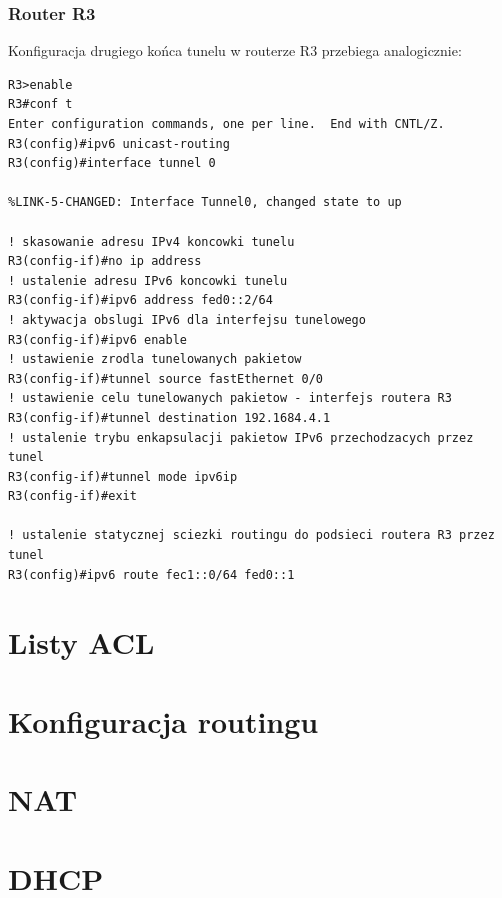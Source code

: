 \documentclass[polish,11pt,a4paper,twoside]{article}
\begin{document}
\subsubsection{Router R3}
Konfiguracja drugiego końca tunelu w routerze R3 przebiega analogicznie:
\begin{lstlisting}
R3>enable
R3#conf t
Enter configuration commands, one per line.  End with CNTL/Z.
R3(config)#ipv6 unicast-routing 
R3(config)#interface tunnel 0

%LINK-5-CHANGED: Interface Tunnel0, changed state to up

! skasowanie adresu IPv4 koncowki tunelu
R3(config-if)#no ip address 
! ustalenie adresu IPv6 koncowki tunelu
R3(config-if)#ipv6 address fed0::2/64
! aktywacja obslugi IPv6 dla interfejsu tunelowego
R3(config-if)#ipv6 enable
! ustawienie zrodla tunelowanych pakietow
R3(config-if)#tunnel source fastEthernet 0/0
! ustawienie celu tunelowanych pakietow - interfejs routera R3
R3(config-if)#tunnel destination 192.1684.4.1
! ustalenie trybu enkapsulacji pakietow IPv6 przechodzacych przez tunel
R3(config-if)#tunnel mode ipv6ip
R3(config-if)#exit

! ustalenie statycznej sciezki routingu do podsieci routera R3 przez tunel
R3(config)#ipv6 route fec1::0/64 fed0::1
\end{lstlisting}


\section{Listy ACL}
\section{Konfiguracja routingu}
\section{NAT}
\section{DHCP}
\end{document}

